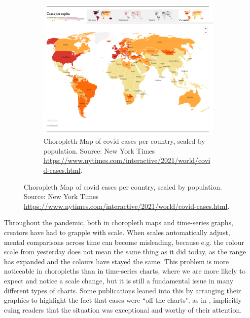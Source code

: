 \documentclass[article]{jdssv}\usepackage[]{graphicx}\usepackage[]{color}
\begin{document}
\begin{figure}
\begin{subfigure}[t]{.45\textwidth}
\includegraphics[width=\textwidth]{nyt-covid-scaled-choro}
\caption{Choropleth Map of covid cases per country, scaled by population. Source: New York Times \url{https://www.nytimes.com/interactive/2021/world/covid-cases.html}.}\label{fig:scaled-choro}
\end{subfigure}
\end{figure}


Throughout the pandemic, both in choropleth maps and time-series graphs, creators have had to grapple with scale. When scales automatically adjust, mental comparisons across time can become misleading, because e.g. the colour scale from yesterday does not mean the same thing as it did today, as the range has expanded and the colours have stayed the same. This problem is more noticeable in choropleths than in time-series charts, where we are more likely to expect and notice a scale change, but it is still a fundamental issue in many different types of charts. Some publications leaned into this by arranging their graphics to highlight the fact that cases were ``off the charts", as in , implicitly cuing readers that the situation was exceptional and worthy of their attention.
\end{document}
